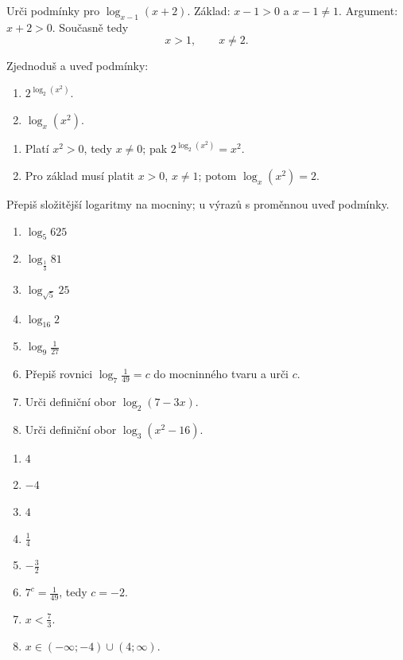 \documentclass[11pt,a4paper]{article}
\begin{document}
\begin{prikladReseniBox}[title={Rozšíření 1}]
Urči podmínky pro $\log_{x-1}(x+2)$.
\tcblower
Základ: $x-1>0$ a $x-1\ne1$. Argument: $x+2>0$. Současně tedy
\[
x>1,\qquad x\ne2.
\]
\end{prikladReseniBox}
\begin{prikladReseniBox}[title={Rozšíření 2}]
Zjednoduš a uveď podmínky:
\begin{enumerate}[label=\alph*)]
\item $2^{\log_2(x^2)}$.
\item $\log_x(x^2)$.
\end{enumerate}
\tcblower
\begin{enumerate}[label=\alph*)]
\item Platí $x^2>0$, tedy $x\ne0$; pak $2^{\log_2(x^2)}=x^2$.
\item Pro základ musí platit $x>0$, $x\ne1$; potom $\log_x(x^2)=2$.
\end{enumerate}
\end{prikladReseniBox}
Přepiš složitější logaritmy na mocniny; u výrazů s proměnnou uveď podmínky.
\begin{zadaniReseniBox}[title={Domácí úkol}]
\begin{enumerate}[label=\alph*)]
\item $\log_5 625$
\item $\log_{\frac13}81$
\item $\log_{\sqrt5}25$
\item $\log_{16}2$
\item $\log_9\frac1{27}$
\item Přepiš rovnici $\log_7\frac1{49}=c$ do mocninného tvaru a urči $c$.
\item Urči definiční obor $\log_2(7-3x)$.
\item Urči definiční obor $\log_3(x^2-16)$.
\end{enumerate}
\tcblower
\begin{enumerate}[label=\alph*)]
\item $4$
\item $-4$
\item $4$
\item $\frac14$
\item $-\frac32$
\item $7^c=\frac1{49}$, tedy $c=-2$.
\item $x<\frac73$.
\item $x\in(-\infty;-4)\cup(4;\infty)$.
\end{enumerate}
\end{zadaniReseniBox}
\end{document}
